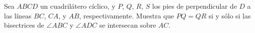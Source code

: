 Sea $ABCD$ un cuadrilátero cíclico, y $P$, $Q$, $R$, $S$ los pies de perpendicular de $D$ a las líneas $BC$, $CA$, y $AB$, respectivamente. Muestra que $PQ=QR$ si y sólo si las bisectrices de $\angle ABC$ y $\angle ADC$ se intersecan sobre $AC$.